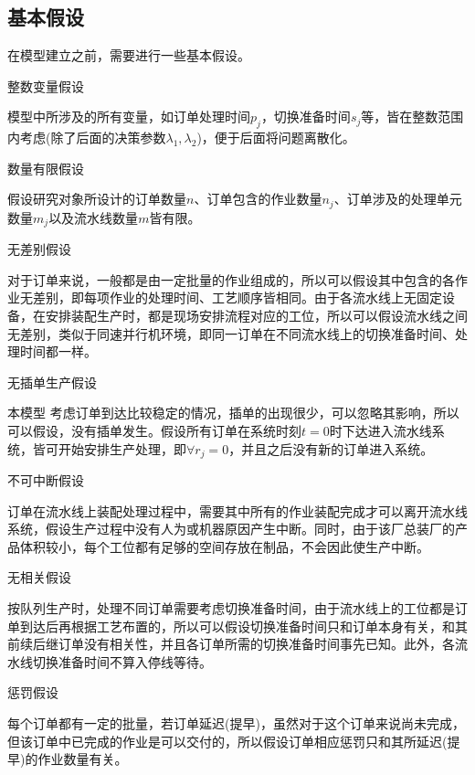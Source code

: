 \subsection{基本假设}
在模型建立之前，需要进行一些基本假设。
\begin{compactenum}
\item 整数变量假设

模型中所涉及的所有变量，如订单处理时间$p_j$，切换准备时间$s_j$等，皆在整数范围内考虑(除了后面的决策参数$\lambda_1, \lambda_2$)，便于后面将问题离散化。
\item 数量有限假设

假设研究对象所设计的订单数量$n$、订单包含的作业数量$n_j$、订单涉及的处理单元数量$m_j$以及流水线数量$m$皆有限。
\item 无差别假设

对于订单来说，一般都是由一定批量的作业组成的，所以可以假设其中包含的各作业无差别，即每项作业的处理时间、工艺顺序皆相同。由于各流水线上无固定设备，在安排装配生产时，都是现场安排流程对应的工位，所以可以假设流水线之间无差别，类似于同速并行机环境，即同一订单在不同流水线上的切换准备时间、处理时间都一样。
\item 无插单生产假设

本模型 考虑订单到达比较稳定的情况，插单的出现很少，可以忽略其影响，所以可以假设，没有插单发生。假设所有订单在系统时刻$t = 0$时下达进入流水线系统，皆可开始安排生产处理，即$\forall r_j =0$，并且之后没有新的订单进入系统。
\item 不可中断假设

订单在流水线上装配处理过程中，需要其中所有的作业装配完成才可以离开流水线系统，假设生产过程中没有人为或机器原因产生中断。同时，由于该厂总装厂的产品体积较小，每个工位都有足够的空间存放在制品，不会因此使生产中断。
\item 无相关假设

按队列生产时，处理不同订单需要考虑切换准备时间，由于流水线上的工位都是订单到达后再根据工艺布置的，所以可以假设切换准备时间只和订单本身有关，和其前续后继订单没有相关性，并且各订单所需的切换准备时间事先已知。此外，各流水线切换准备时间不算入停线等待。
\item 惩罚假设
\end{compactenum}

每个订单都有一定的批量，若订单延迟(提早)，虽然对于这个订单来说尚未完成，但该订单中已完成的作业是可以交付的，所以假设订单相应惩罚只和其所延迟(提早)的作业数量有关。
